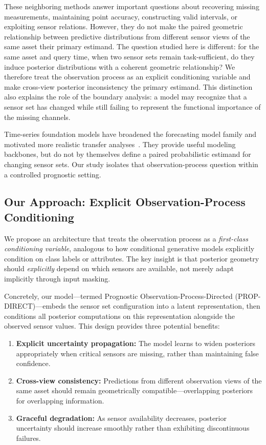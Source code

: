 These neighboring methods answer important questions about recovering missing
measurements, maintaining point accuracy, constructing valid intervals, or exploiting
sensor relations. However, they do not make the paired geometric relationship between
predictive distributions from different sensor views of the same asset their primary
estimand. The question studied here is different: for the same asset and query time,
when two sensor sets remain task-sufficient, do they induce posterior distributions
with a coherent geometric relationship? We therefore treat the observation process
as an explicit conditioning variable and make cross-view posterior inconsistency the
primary estimand. This distinction also explains the role of the boundary analysis:
a model may recognize that a sensor set has changed while still failing to represent
the functional importance of the missing channels.

Time-series foundation models have broadened the forecasting model family and
motivated more realistic transfer analyses~\citep{rasul202331008278,ansari202440307815,qiu202443665863}.
They provide useful modeling backbones, but do not by themselves define a paired
probabilistic estimand for changing sensor sets. Our study isolates that
observation-process question within a controlled prognostic setting.

\subsection{Our Approach: Explicit Observation-Process Conditioning}

We propose an architecture that treats the observation process as a \emph{first-class conditioning variable}, analogous to how conditional generative models explicitly condition on class labels or attributes. The key insight is that posterior geometry should \emph{explicitly} depend on which sensors are available, not merely adapt implicitly through input masking.

Concretely, our model---termed Prognostic Observation-Process-Directed (PROP-DIRECT)---embeds the sensor set configuration into a latent representation, then conditions all posterior computations on this representation alongside the observed sensor values. This design provides three potential benefits:

\begin{enumerate}
    \item \textbf{Explicit uncertainty propagation:} The model learns to widen posteriors appropriately when critical sensors are missing, rather than maintaining false confidence.
    \item \textbf{Cross-view consistency:} Predictions from different observation views of the same asset should remain geometrically compatible---overlapping posteriors for overlapping information.
    \item \textbf{Graceful degradation:} As sensor availability decreases, posterior uncertainty should increase smoothly rather than exhibiting discontinuous failures.
\end{enumerate}

